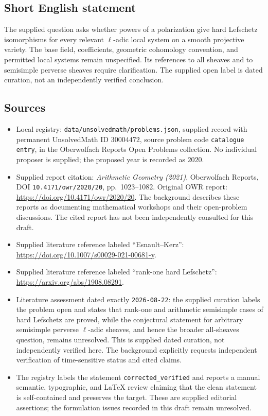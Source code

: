 \documentclass[11pt]{article}
\begin{document}
\subsection{Short English statement}
The supplied question asks whether powers of a polarization give hard Lefschetz isomorphisms for every relevant \(\ell\)-adic local system on a smooth projective variety. The base field, coefficients, geometric cohomology convention, and permitted local systems remain unspecified. Its references to all sheaves and to semisimple perverse sheaves require clarification. The supplied open label is dated curation, not an independently verified conclusion.
\subsection{Sources}
\begin{itemize}
\item Local registry: \texttt{data/unsolvedmath/problems.json}, supplied record with permanent UnsolvedMath ID \(30004472\), source problem code \texttt{catalogue entry}, in the Oberwolfach Reports Open Problems collection. No individual proposer is supplied; the proposed year is recorded as \(2020\).
\item Supplied report citation: \emph{Arithmetic Geometry (2021)}, Oberwolfach Reports, DOI \texttt{10.4171/owr/2020/20}, pp.\ 1023--1082. Original OWR report: \url{https://doi.org/10.4171/owr/2020/20}. The background describes these reports as documenting mathematical workshops and their open-problem discussions. The cited report has not been independently consulted for this draft.
\item Supplied literature reference labeled ``Esnault--Kerz'': \url{https://doi.org/10.1007/s00029-021-00681-y}.
\item Supplied literature reference labeled ``rank-one hard Lefschetz'': \url{https://arxiv.org/abs/1908.08291}.
\item Literature assessment dated exactly \texttt{2026-08-22}: the supplied curation labels the problem open and states that rank-one and arithmetic semisimple cases of hard Lefschetz are proved, while the conjectural statement for arbitrary semisimple perverse \(\ell\)-adic sheaves, and hence the broader all-sheaves question, remains unresolved. This is supplied dated curation, not independently verified here. The background explicitly requests independent verification of time-sensitive status and cited claims.
\item The registry labels the statement \texttt{corrected\_verified} and reports a manual semantic, typographic, and LaTeX review claiming that the clean statement is self-contained and preserves the target. These are supplied editorial assertions; the formulation issues recorded in this draft remain unresolved.
\end{itemize}
\end{document}
